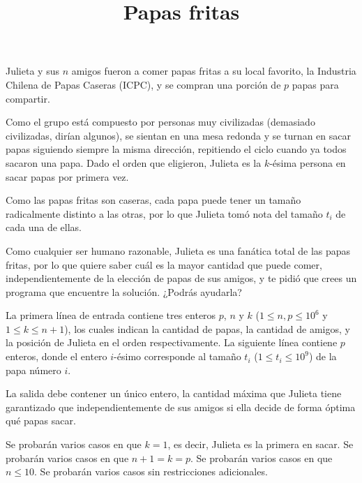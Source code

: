 \documentclass{oci}
\title{Papas fritas}
\begin{document}
\begin{problemDescription}
	Julieta y sus $n$ amigos fueron a comer papas fritas a su local favorito, la Industria Chilena de Papas Caseras (ICPC), y se compran una porción de $p$ papas para compartir.


	Como el grupo está compuesto por personas muy civilizadas (demasiado civilizadas, dirían algunos), se sientan en una mesa redonda y se turnan en sacar papas siguiendo siempre la misma dirección, repitiendo el ciclo cuando ya todos sacaron una papa. Dado el orden que eligieron, Julieta es la $k$-ésima persona en sacar papas por primera vez.

	Como las papas fritas son caseras, cada papa puede tener un tamaño radicalmente distinto a las otras, por lo que Julieta tomó nota del tamaño $t_i$ de cada una de ellas.

	Como cualquier ser humano razonable, Julieta es una fanática total de las papas fritas, por lo que quiere saber cuál es la mayor cantidad que puede comer, independientemente de la elección de papas de sus amigos, y te pidió que crees un programa que encuentre la solución. ¿Podrás ayudarla?
\end{problemDescription}

\begin{inputDescription}
	La primera línea de entrada contiene tres enteros $p$, $n$ y $k$ ($1 \leq n, p \leq 10^6$ y $1 \leq k \leq n+1$), los cuales indican la cantidad de papas, la cantidad de amigos, y la posición de Julieta en el orden respectivamente.
	La siguiente línea contiene $p$ enteros, donde el entero $i$-ésimo corresponde al tamaño $t_i$ ($1 \leq t_i \leq 10^9$) de la papa número $i$.
\end{inputDescription}

\begin{outputDescription}
	La salida debe contener un único entero, la cantidad máxima que Julieta tiene garantizado que independientemente de sus amigos si ella decide de forma óptima qué papas sacar.
\end{outputDescription}

\begin{scoreDescription}
  	Se probarán varios casos en que $k = 1$, es decir, Julieta es la primera en sacar.
 	Se probarán varios casos en que $n+1 = k = p$.
  	Se probarán varios casos en que $n \leq 10$.
	Se probarán varios casos sin restricciones adicionales.
\end{scoreDescription}

\begin{sampleDescription}
\end{sampleDescription}
\end{document}
